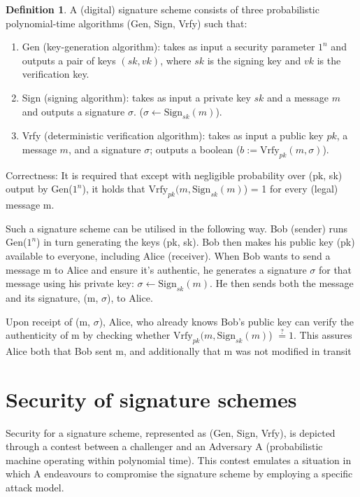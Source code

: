 \documentclass[]{final_report}
\theoremstyle{definition}
\newtheorem{definition}{Definition}[chapter]
\begin{document}
\begin{definition}
\label{def:digital signature}
A (digital) signature scheme consists of three probabilistic polynomial-time algorithms (Gen, Sign, Vrfy) such that:
\begin{enumerate}
    \item Gen (key-generation algorithm): takes as input a security parameter $1^n$ and outputs a pair of keys $(sk ,vk)$, where $sk$ is the signing key and $vk$ is the verification key.
    \item Sign (signing algorithm): takes as input a private key $sk$ and a message $m$ and outputs a signature $\sigma$. ($\sigma \leftarrow \text{Sign}_{sk}(m)$).
    \item Vrfy (deterministic verification algorithm):  takes as input a public key $pk$, a message $m$, and a signature $\sigma$; outputs a boolean ($b := \text{Vrfy}_{pk}(m, \sigma)$).
\end{enumerate}
\end{definition}




Correctness: It is required that except with negligible probability over (pk, sk) output by Gen($1^n$), it holds that $\text{Vrfy}_{pk} (m, \text{Sign}_{sk}(m)$) = 1 for every (legal) message m. 

Such a signature scheme can be utilised in the following way. 
Bob (sender) runs Gen($1^n$) in turn generating the keys (pk, sk). Bob then makes his public key (pk) available to everyone, including Alice (receiver). 
When Bob wants to send a message m to Alice and ensure it's authentic, he generates a signature $\sigma$ for that message using his private key: $\sigma \leftarrow \text{Sign}_{sk}(m)$. He then sends both the message and its signature, (m, $\sigma$), to Alice.

Upon receipt of (m, $\sigma$), Alice, who already knows Bob's public key can verify the authenticity of m by checking whether $\text{Vrfy}_{pk} (m, \text{Sign}_{sk}(m)$) $\stackrel{?}{=} 1$. This assures Alice both that Bob sent m, and additionally that m was not modified in transit

\section{Security of signature schemes}
Security for a signature scheme, represented as (Gen, Sign, Vrfy), is depicted through a contest between a challenger and an Adversary A (probabilistic machine operating within polynomial time). This contest emulates a situation in which A endeavours to compromise the signature scheme by employing a specific attack model. 
\end{document}
